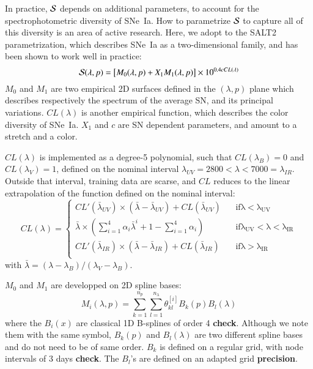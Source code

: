 \documentclass{aa}
\begin{document}
In practice, ${\cal S}$ depends on additional parameters, to account
for the spectrophotometric diversity of SNe~Ia. How to parametrize
${\cal S}$ to capture all of this diversity is an area of active
research. Here, we adopt to the SALT2 parametrization, which describes
SNe~Ia as a two-dimensional family, and has been shown to work well in
practice:
\begin{equation}
  {\cal S}(\lambda,p) = \left[M_0(\lambda,p) + X_1 M_1(\lambda,p) \right] \times 10^{0.4 c CL(\lambda)}
\end{equation}
$M_0$ and $M_1$ are two empirical 2D surfaces defined in the
$(\lambda,p)$ plane which describes respectively the spectrum of the
average SN, and its principal variations. $CL(\lambda)$ is another
empirical function, which describes the color diversity of SNe~Ia.
$X_1$ and $c$ are SN dependent parameters, and amount to a stretch and
a color.

$CL(\lambda)$ is implemented as a degree-5 polynomial, such that
$CL(\lambda_B)=0$ and $CL(\lambda_V)=1$, defined on the nominal
interval $\lambda_{UV}=2800 < \lambda < 7000=\lambda_{IR}$. Outside
that interval, training data are scarse, and $CL$ reduces to the
linear extrapolation of the function defined on the nominal interval:
\begin{equation}  
    CL(\lambda) = \left\{ \begin{aligned}
      CL'(\bar\lambda_{UV}) \times (\bar\lambda-\bar\lambda_{UV}) + CL(\bar\lambda_{UV})  & \ \ \ \ \mathrm{if \lambda < \lambda_{UV}} \\
      \bar\lambda \times \left(\sum_{i=1}^4 \alpha_i \bar\lambda^i + 1 - \sum_{i=1}^4\alpha_i\right)       & \ \ \ \ \mathrm{if \lambda_{UV} < \lambda < \lambda_{IR}} \\
      CL'(\bar\lambda_{IR}) \times (\bar\lambda-\bar\lambda_{IR}) + CL(\bar\lambda_{IR})  & \ \ \ \ \mathrm{if \lambda > \lambda_{IR}} \\
    \end{aligned}\right.
\end{equation}
with $\bar{\lambda} = (\lambda-\lambda_B) / (\lambda_V - \lambda_B)$.

$M_0$ and $M_1$ are developped on 2D spline bases:
\begin{equation}
  {M_i}(\lambda,p) = \sum_{k=1}^{n_p} \sum_{l=1}^{n_\lambda} \theta_{kl}^{[i]} B_k(p) B_l(\lambda)
\end{equation}
where the $B_i(x)$ are classical 1D B-splines of order 4 {\bf check}.
Although we note them with the same symbol, $B_k(p)$ and
$B_l(\lambda)$ are two different spline bases and do not need to be of
same order. $B_k$ is defined on a regular grid, with node intervals of
3 days {\bf check}.  The $B_l$'s are defined on an adapted grid {\bf
  precision}.
\end{document}
